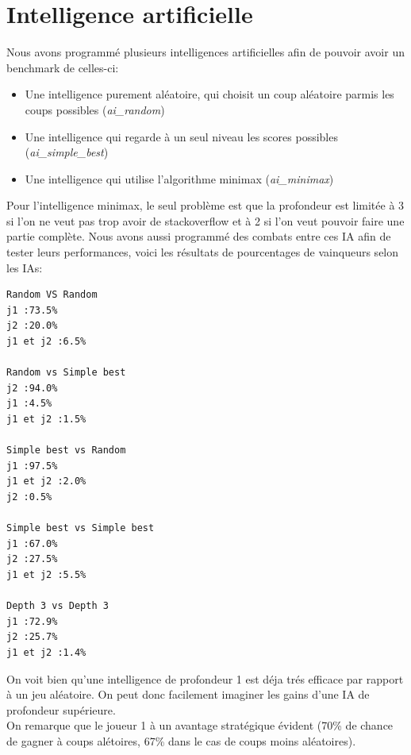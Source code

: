 \documentclass[11pt,a4paper,twoside,french,svgnames]{report}
\begin{document}
\section{Intelligence artificielle}
Nous avons programmé plusieurs intelligences artificielles afin de pouvoir avoir un benchmark de celles-ci:
\begin{itemize}
    \item Une intelligence purement aléatoire, qui choisit un coup aléatoire parmis les coups possibles (\textit{ai\_random})
    \item Une intelligence qui regarde à un seul niveau les scores possibles (\textit{ai\_simple\_best})
    \item Une intelligence qui utilise l'algorithme minimax (\textit{ai\_minimax})
\end{itemize}

Pour l'intelligence minimax, le seul problème est que la profondeur est limitée à 3 si l'on ne veut pas trop avoir de stackoverflow et à 2 si l'on veut pouvoir faire une partie complète.
Nous avons aussi programmé des combats entre ces IA afin de tester leurs performances, voici les résultats de pourcentages de vainqueurs selon les IAs:

\begin{lstlisting}
Random VS Random
j1 :73.5%
j2 :20.0%
j1 et j2 :6.5%

Random vs Simple best
j2 :94.0%
j1 :4.5%
j1 et j2 :1.5%

Simple best vs Random
j1 :97.5%
j1 et j2 :2.0%
j2 :0.5%

Simple best vs Simple best
j1 :67.0%
j2 :27.5%
j1 et j2 :5.5%

Depth 3 vs Depth 3
j1 :72.9%
j2 :25.7%
j1 et j2 :1.4%
\end{lstlisting}

On voit bien qu'une intelligence de profondeur 1 est déja trés efficace par rapport à un jeu aléatoire. On peut donc facilement imaginer les gains d'une IA de profondeur supérieure.\\
On remarque que le joueur 1 à un avantage stratégique évident (70\% de chance de gagner à coups alétoires, 67\% dans le cas de coups moins aléatoires).\\
\end{document}
